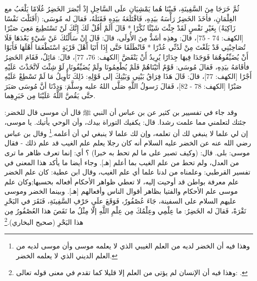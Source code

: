 {ثُمَّ خَرَجَا مِنَ السَّفِينَةِ، فَبيْنَا هُما يَمْشِيَانِ علَى السَّاحِلِ إذْ أبْصَرَ الخَضِرُ غُلَامًا يَلْعَبُ مع الغِلْمَانِ، فأخَذَ الخَضِرُ رَأْسَهُ بيَدِهِ، فَاقْتَلَعَهُ بيَدِهِ فَقَتَلَهُ، فَقالَ له مُوسَى: (أَقَتَلْتَ نَفْسًا زَاكِيَةً) {بِغَيْرِ نَفْسٍ لَقَدْ جِئْتَ شَيْئًا نُكْرًا * قَالَ أَلَمْ أَقُلْ لَكَ إِنَّكَ لَنْ تَسْتَطِيعَ مَعِيَ صَبْرًا} [الكهف: 74 - 75]، قالَ: وهذِه أشَدُّ مِنَ الأُولَى، قالَ: {قَالَ إِنْ سَأَلْتُكَ عَنْ شَيْءٍ بَعْدَهَا فَلَا تُصَاحِبْنِي قَدْ بَلَغْتَ مِنْ لَدُنِّي عُذْرًا * فَانْطَلَقَا حَتَّى إِذَا أَتَيَا أَهْلَ قَرْيَةٍ اسْتَطْعَمَا أَهْلَهَا فَأَبَوْا أَنْ يُضَيِّفُوهُمَا فَوَجَدَا فِيهَا جِدَارًا يُرِيدُ أَنْ يَنْقَضَّ} [الكهف: 76، 77]، قالَ: مَائِلٌ، فَقَامَ الخَضِرُ فأقَامَهُ بيَدِهِ، فَقالَ مُوسَى: قَوْمٌ أتَيْنَاهُمْ فَلَمْ يُطْعِمُونَا ولَمْ يُضَيِّفُونَا، {لَوْ شِئْتَ لَاتَّخَذْتَ عَلَيْهِ أَجْرًا} [الكهف: 77]، قالَ: {قَالَ هَذَا فِرَاقُ بَيْنِي وَبَيْنِكَ} إلى قَوْلِهِ: {ذَلِكَ تَأْوِيلُ مَا لَمْ تَسْطِعْ عَلَيْهِ صَبْرًا} [الكهف: 78 - 82]، فَقالَ رَسولُ اللَّهِ صَلَّى اللهُ عليه وسلَّمَ: وَدِدْنَا أنَّ مُوسَى صَبَرَ حتَّى يَقُصَّ اللَّهُ عَلَيْنَا مِن خَبَرِهِما. 
}

وقد جاء في تفسيير بن كثير عن بن عباس أن النبي ﷺ قال أن موسى قال للخضر: جئتك لتعلمني مما علمت رشدا. قال: يكفيك التوراة بيدك، وأن الوحي يأتيك. يا موسى، إن لي علما لا ينبغي لك أن تعلمه، وإن لك علما لا ينبغي لي أن أعلمه.\footnote{وهذا فيه أن الخضر لديه من العلم الغيبي الذي لا يعلمه موسى وأن موسى لديه من العلم الديني الذي لا يعلمه الخضر.} وقال بن عباس رضي الله عنه عن الخضر عليه السلام أنه كان رجلا يعلم علم الغيب قد علم ذلك - فقال موسى: بلى. قال: (وكيف تصبر على ما لم تحط به خبرا) ؟ أي: إنما تعرف ظاهر ما ترى من العدل، ولم تحط من علم الغيب بما أعلم [هـ]. وجاء أيضا ما يأكد هذا المعنى في تفسير القرطبي: وعلمناه من لدنا علما أي علم الغيب، وقال ابن عطية: كان علم الخضر علم معرفة بواطن قد أوحيت إليه، لا تعطي ظواهر الأحكام أفعاله بحسبها;وكان علم موسى علم الأحكام والفتيا بظاهر أقوال الناس وأفعالهم [هـ].
وبينما الخضر وموسى عليهم السلام على السفينة، جَاءَ عُصْفُورٌ، فَوَقَعَ علَى حَرْفِ السَّفِينَةِ، فَنَقَرَ في البَحْرِ نَقْرَةً، فَقالَ له الخَضِرُ: ما عِلْمِي وعِلْمُكَ مِن عِلْمِ اللَّهِ إلَّا مِثْلُ ما نَقَصَ هذا العُصْفُورُ مِن هذا البَحْرِ {\footnotesize (صحيح البخاري)}.\footnote{وهذا فيه أن الإنسان لم يؤتى من العلم إلا قليلا كما تقدم في معنى قوله تعالى:
\quranayah*[17][85]{\footnotesize \surahname*[17]}.} 

